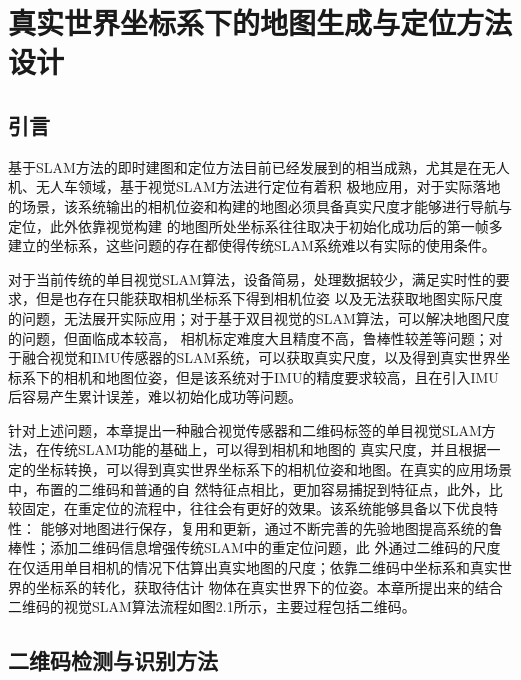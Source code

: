 \chapter{真实世界坐标系下的地图生成与定位方法设计}
\label{cha:chap2}

\section{引言}
\label{sec:2.1}
基于SLAM方法的即时建图和定位方法目前已经发展到的相当成熟，尤其是在无人机、无人车领域，基于视觉SLAM方法进行定位有着积
极地应用，对于实际落地的场景，该系统输出的相机位姿和构建的地图必须具备真实尺度才能够进行导航与定位，此外依靠视觉构建
的地图所处坐标系往往取决于初始化成功后的第一帧多建立的坐标系，这些问题的存在都使得传统SLAM系统难以有实际的使用条件。

对于当前传统的单目视觉SLAM算法，设备简易，处理数据较少，满足实时性的要求，但是也存在只能获取相机坐标系下得到相机位姿
以及无法获取地图实际尺度的问题，无法展开实际应用；对于基于双目视觉的SLAM算法，可以解决地图尺度的问题，但面临成本较高，
相机标定难度大且精度不高，鲁棒性较差等问题；对于融合视觉和IMU传感器的SLAM系统，可以获取真实尺度，以及得到真实世界坐
标系下的相机和地图位姿，但是该系统对于IMU的精度要求较高，且在引入IMU后容易产生累计误差，难以初始化成功等问题。

针对上述问题，本章提出一种融合视觉传感器和二维码标签的单目视觉SLAM方法，在传统SLAM功能的基础上，可以得到相机和地图的
真实尺度，并且根据一定的坐标转换，可以得到真实世界坐标系下的相机位姿和地图。在真实的应用场景中，布置的二维码和普通的自
然特征点相比，更加容易捕捉到特征点，此外，比较固定，在重定位的流程中，往往会有更好的效果。该系统能够具备以下优良特性：
能够对地图进行保存，复用和更新，通过不断完善的先验地图提高系统的鲁棒性；添加二维码信息增强传统SLAM中的重定位问题，此
外通过二维码的尺度在仅适用单目相机的情况下估算出真实地图的尺度；依靠二维码中坐标系和真实世界的坐标系的转化，获取待估计
物体在真实世界下的位姿。本章所提出来的结合二维码的视觉SLAM算法流程如图2.1所示，主要过程包括二维码。
\section{二维码检测与识别方法}
\label{sec:2.2}
